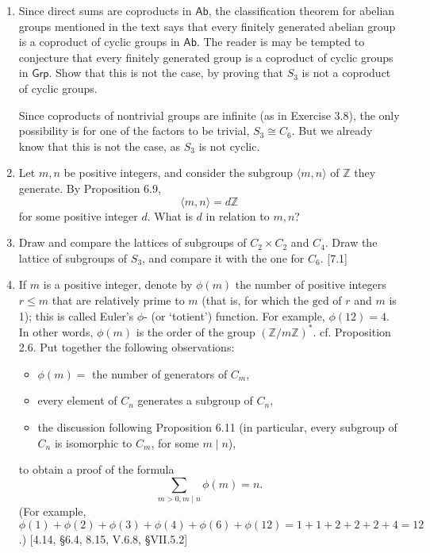 \begin{enumerate}
    \item Since direct sums are coproducts in $\mathsf{Ab}$, the classification theorem for abelian groups mentioned in the text says that every finitely generated abelian group is a coproduct of cyclic groups in $\mathsf{Ab}$. The reader is may be tempted to conjecture that every finitely generated group is a coproduct of cyclic groups in $\mathsf{Grp}$. Show that this is not the case, by proving that $S_3$ is not a coproduct of cyclic groups.
    \begin{solution}
      Since coproducts of nontrivial groups are infinite (as in Exercise 3.8), the only possibility is for one of the factors to be trivial, $S_3 \cong C_6$. But we already know that this is not the case, as $S_3$ is not cyclic.

    \end{solution}

    \item Let $m, n$ be positive integers, and consider the subgroup $\langle m, n \rangle$ of $\mathbb{Z}$ they generate. By Proposition 6.9,
          \[ \langle m, n \rangle = d\mathbb{Z} \]
          for some positive integer $d$. What is $d$ in relation to $m, n$?

    \item Draw and compare the lattices of subgroups of $C_2 \times C_2$ and $C_4$. Draw the lattice of subgroups of $S_3$, and compare it with the one for $C_6$. [7.1]

    \item If $m$ is a positive integer, denote by $\phi(m)$ the number of positive integers $r \le m$ that are relatively prime to $m$ (that is, for which the $\text{gcd}$ of $r$ and $m$ is 1); this is called Euler's $\phi$- (or `totient') function. For example, $\phi(12)=4$. In other words, $\phi(m)$ is the order of the group $(\mathbb{Z}/m\mathbb{Z})^*$. cf. Proposition 2.6.
          Put together the following observations:
          \begin{itemize}
              \item $\phi(m) = $ the number of generators of $C_m$,
              \item every element of $C_n$ generates a subgroup of $C_n$,
              \item the discussion following Proposition 6.11 (in particular, every subgroup of $C_n$ is isomorphic to $C_m$, for some $m \mid n$),
          \end{itemize}
          to obtain a proof of the formula
          \[ \sum_{m>0, m \mid n} \phi(m) = n. \]
          (For example, $\phi(1)+\phi(2)+\phi(3)+\phi(4)+\phi(6)+\phi(12) = 1+1+2+2+2+4 = 12$.) [4.14, \S6.4, 8.15, V.6.8, \S VII.5.2]


\end{enumerate}
